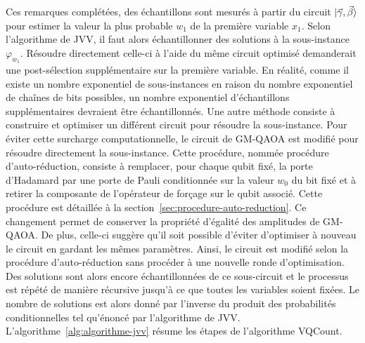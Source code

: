 Ces remarques complétées, des échantillons sont mesurés à partir du circuit $\ket{\vec{\gamma}, \vec{\beta}}$ pour estimer la valeur la plus probable $w_{1}$ de la première variable $x_{1}$. Selon l'algorithme de JVV, il faut alors échantillonner des solutions à la sous-instance $\varphi_{w_{1}}$. Résoudre directement celle-ci à l'aide du même circuit optimisé demanderait une post-sélection supplémentaire sur la première variable. En réalité, comme il existe un nombre exponentiel de sous-instances en raison du nombre exponentiel de chaînes de bits possibles, un nombre exponentiel d'échantillons supplémentaires devraient être échantillonnés. Une autre méthode consiste à construire et optimiser un différent circuit pour résoudre la sous-instance. Pour éviter cette surcharge computationnelle, le circuit de GM-QAOA est modifié pour résoudre directement la sous-instance. Cette procédure, nommée procédure d'auto-réduction, consiste à remplacer, pour chaque qubit fixé, la porte d'Hadamard par une porte de Pauli conditionnée sur la valeur $w_{0}$ du bit fixé et à retirer la composante de l'opérateur de forçage sur le qubit associé. Cette procédure est détaillée à la section~\ref{sec:procedure-auto-reduction}. Ce changement permet de conserver la propriété d'égalité des amplitudes de GM-QAOA. De plus, celle-ci suggère qu'il soit possible d'éviter d'optimiser à nouveau le circuit en gardant les mêmes paramètres. Ainsi, le circuit est modifié selon la procédure d'auto-réduction sans procéder à une nouvelle ronde d'optimisation. Des solutions sont alors encore échantillonnées de ce sous-circuit et le processus est répété de manière récursive jusqu'à ce que toutes les variables soient fixées. Le nombre de solutions est alors donné par l'inverse du produit des probabilités conditionnelles tel qu'énoncé par l'algorithme de JVV. L'algorithme~\ref{alg:algorithme-jvv} résume les étapes de l'algorithme VQCount.

